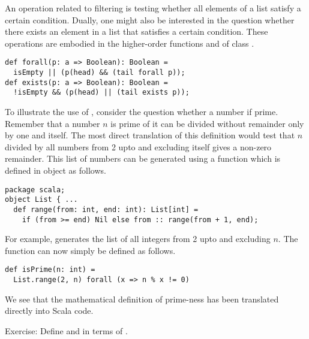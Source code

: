 An operation related to filtering is testing whether all elements of a
list satisfy a certain condition. Dually, one might also be interested
in the question whether there exists an element in a list that
satisfies a certain condition. These operations are embodied in the
higher-order functions  and  of class
.
\begin{lstlisting}
def forall(p: a => Boolean): Boolean =
  isEmpty || (p(head) && (tail forall p));
def exists(p: a => Boolean): Boolean =
  !isEmpty && (p(head) || (tail exists p));
\end{lstlisting}
To illustrate the use of , consider the question whether
a number if prime. Remember that a number $n$ is prime of it can be
divided without remainder only by one and itself. The most direct
translation of this definition would test that $n$ divided by all
numbers from 2 upto and excluding itself gives a non-zero
remainder. This list of numbers can be generated using a function
 which is defined in object  as follows.
\begin{lstlisting}
package scala;
object List { ... 
  def range(from: int, end: int): List[int] = 
    if (from >= end) Nil else from :: range(from + 1, end);
\end{lstlisting}
For example, 
generates the list of all integers from 2 upto and excluding $n$.
The function  can now simply be defined as follows.
\begin{lstlisting}
def isPrime(n: int) = 
  List.range(2, n) forall (x => n % x != 0)
\end{lstlisting}
We see that the mathematical definition of prime-ness has been
translated directly into Scala code. 

Exercise: Define  and  in terms of .



